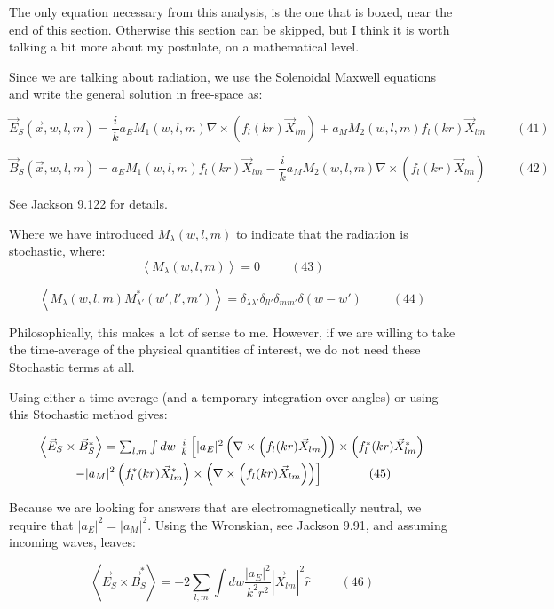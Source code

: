 \documentclass {article}
\begin{document}
The only equation necessary from this analysis, is the one that is boxed, near the end of this section. Otherwise this section can be skipped, but I think it is worth talking a bit more about my postulate, on a mathematical level. 

Since we are talking about radiation, we use the Solenoidal Maxwell equations and write the general solution in free-space as:

$$\vec E_{S}(\vec x, w,l,m) = \frac i {k} a_E M_1(w,l,m) \nabla \times \left(f_l(kr) \vec X_{lm} \right) + a_M M_2(w,l,m) f_l(kr) \vec X_{lm} ~~~~~~~~~~~ (41)$$

$$\vec B_{S}(\vec x, w,l,m) =  a_E M_1(w,l,m) f_l(kr) \vec X_{lm} - \frac i {k} a_M M_2(w,l,m) \nabla \times \left(f_l(kr) \vec X_{lm} \right) ~~~~~~~~~~~ (42)$$

See Jackson 9.122 for details.

Where we have introduced $M_{\lambda}(w,l,m)$ to indicate that the radiation is stochastic, where:
\begin{equation}
\left< M_{\lambda}(w,l,m) \right> = 0 ~~~~~~~~~~~ (43)
\end{equation}

$$\left< M_{\lambda}(w,l,m)M_{\lambda'}^*(w',l',m') \right> = \delta_{\lambda \lambda'} \delta_{ll'}\delta_{mm'}\delta(w - w') ~~~~~~~~~~~ (44)$$ 

Philosophically, this makes a lot of sense to me. However, if we are willing to take the time-average of the physical quantities of interest, we do not need these Stochastic terms at all. 

Using either a time-average (and a temporary integration over angles) or using this Stochastic method gives:

\begin{multline}
$$\left< \vec E_S \times \vec B_S^* \right> = \sum_{l,m} \int dw ~ \frac i k \left[ |a_E|^2\left( \nabla \times \left( f_l(kr) \vec X_{lm} \right)\right) \times \left(f^*_l(kr) \vec X_{lm}^* \right) \right.
\\ \left.- |a_M|^2 \left( f^*_l(kr) \vec X_{lm}^*\right) \times \left( \nabla \times \left( f_l(kr) \vec X_{lm}\right)\right)\right] ~~~~~~~~~~~ (45)$$
\end{multline}


Because we are looking for answers that are electromagnetically neutral, we require that $|a_E|^2 = |a_M|^2$. Using the Wronskian, see Jackson 9.91, and assuming incoming waves, leaves:

$$\left< \vec E_S \times \vec B_S^* \right> =  - 2 \sum_{l,m} \int dw \frac {|a_E|^2}{k^2 r^2} | \vec X_{lm} |^2 \hat r ~~~~~~~~~~~ (46)$$
\end{document}
